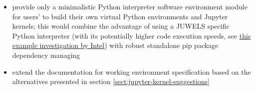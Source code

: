 \begin{itemize}
  \item provide only a minimalistic Python interpreter software environment module for users' to build their own virtual Python environments and Jupyter kernels;
  this would combine the advantage of using a JUWELS specific Python interpreter (with its potentially higher code execution speeds, see \href{https://www.fz-juelich.de/SharedDocs/Downloads/IAS/JSC/EN/slides/supercomputer-ressources-2019-11/15a-tuning_intel.html}{this example investigation by Intel}) with robust standalone pip package dependency managing

  \item extend the documentation for working environment specification based on the alternatives presented in section \ref{sect:jupyter-kernel-suggestions}

\end{itemize}
